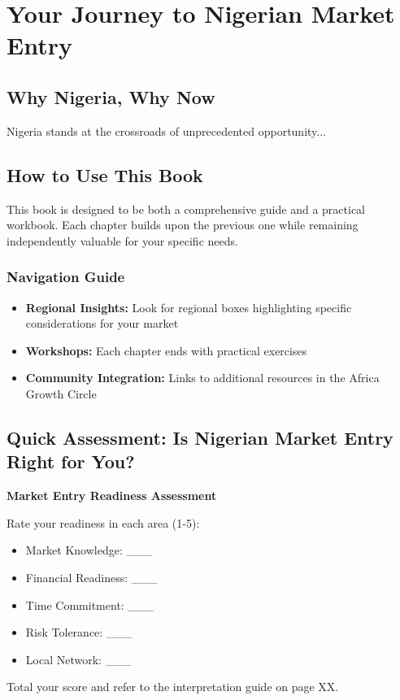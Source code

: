 
\chapter*{Your Journey to Nigerian Market Entry}

\section{Why Nigeria, Why Now}
Nigeria stands at the crossroads of unprecedented opportunity...

\section{How to Use This Book}

\begin{importantbox}
This book is designed to be both a comprehensive guide and a practical workbook. Each chapter builds upon the previous one while remaining independently valuable for your specific needs.
\end{importantbox}

\subsection{Navigation Guide}
\begin{itemize}
    \item \textbf{Regional Insights:} Look for regional boxes highlighting specific considerations for your market
    \item \textbf{Workshops:} Each chapter ends with practical exercises
    \item \textbf{Community Integration:} Links to additional resources in the Africa Growth Circle
\end{itemize}

\section{Quick Assessment: Is Nigerian Market Entry Right for You?}

\begin{workshopbox}
\textbf{Market Entry Readiness Assessment}

Rate your readiness in each area (1-5):
\begin{itemize}
    \item Market Knowledge: \_\_\_
    \item Financial Readiness: \_\_\_
    \item Time Commitment: \_\_\_
    \item Risk Tolerance: \_\_\_
    \item Local Network: \_\_\_
\end{itemize}

Total your score and refer to the interpretation guide on page XX.
\end{workshopbox}

